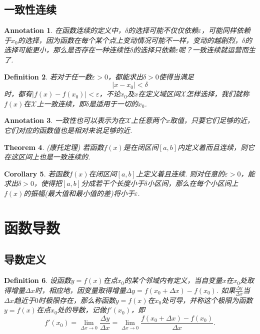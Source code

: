 \documentclass{article}
\newtheorem{theorem}{Theorem}[section]
\newtheorem{corollary}[theorem]{Corollary}
\newtheorem{definition}[theorem]{Definition}
\newtheorem{annotation}[theorem]{Annotation}
\begin{document}
\subsection{一致性连续}

\begin{annotation}
\rm 在函数连续的定义中，$\delta$的选择可能不仅仅依赖$\varepsilon$，可能同样依赖于$x_0$的选择，因为函数在每个某个点上变动情况可能不一样，变动的越剧烈，$\delta$的选择可能更小，那么是否存在一种连续性$\delta$的选择只依赖$\varepsilon$呢？一致连续就运营而生了.
\end{annotation}

\begin{definition}
\rm 若对于任一数$\varepsilon > 0$，都能求出$\delta > 0$使得当满足
$$
|x-x_0| < \delta
$$
时，都有$|f(x)-f(x_0)| < \varepsilon$，不论$x_0$及$x$在定义域区间$\mathcal{X}$怎样选择，我们就称$f(x)$在$\mathcal{X}$上{\color{red}一致连续}，即$\delta$是适用于一切的$x_0$.
\end{definition}

\begin{annotation}
\rm 一致性也可以表示为在$\mathcal{X}$上任意两个$x$取值，只要它们足够的近，它们对应的函数值也是相对来说足够的近. 
\end{annotation}

\begin{theorem}
\rm {\color{red} (康托定理) }若函数$f(x)$是在闭区间$[a,b]$内定义着而且连续，则它在这区间上也是一致连续的.
\end{theorem}

\begin{corollary}
\rm 若函数$f(x)$在闭区间$[a,b]$上定义着且连续. 则对任意的$\varepsilon > 0$，能求出$\delta > 0$，使得把$[a,b]$分成若干个长度小于$\delta$小区间，那么在每个小区间上$f(x)$的振幅(最大值和最小值的差)将小于$\varepsilon$.
\end{corollary}

\newpage
\section{函数导数}

\subsection{导数定义}

\begin{definition}
\rm 设函数$y=f(x)$在点$x_0$的某个邻域内有定义，当自变量$x$在$x_0$处取得增量$\Delta x$时，相应地，因变量取得增量$\Delta y = f(x_0 + \Delta x) - f(x_0)$. 如果$\frac{\Delta y}{\Delta x}$当$\Delta x$趋近于$0$时极限存在，那么称函数$y = f(x)$在$x_0$处可导，并称这个极限为函数$y=f(x)$在点$x_0$处的导数，记做$f'(x_0)$，即
$$
f'(x_0) = \lim\limits_{\Delta x \rightarrow 0} \frac{\Delta y}{\Delta x} = \lim\limits_{\Delta x \rightarrow 0} \frac{f(x_0 + \Delta x) - f(x_0)}{\Delta x}.
$$
\end{definition}
\end{document}
